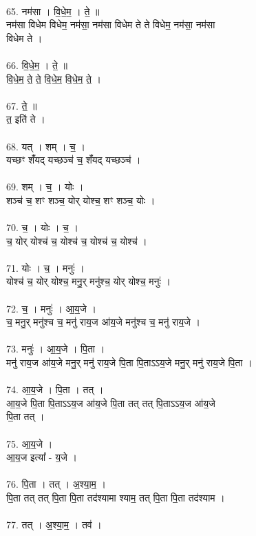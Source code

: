 \\
65. नम॑सा । वि॒धे॒म॒ । ते॒ ॥\\
नम॑सा विधेम विधेम॒ नम॑सा॒ नम॑सा विधेम ते ते विधेम॒ नम॑सा॒ नम॑सा\\
विधेम ते ।\\
\\
66. वि॒धे॒म॒ । ते॒ ॥\\
वि॒धे॒म॒ ते॒ ते॒ वि॒धे॒म॒ वि॒धे॒म॒ ते॒ ।\\
\\
67. ते॒ ॥\\
त॒ इति॑ ते ।\\
\\
68. यत् । शम् । च॒ ।\\
यच्छꣳ शंँयद् यच्छञ्च॑ च॒ शंँयद् यच्छञ्च॑ ।\\
\\
69. शम् । च॒ । योः ।\\
शञ्च॑ च॒ शꣳ शञ्च॒ योर् योश्च॒ शꣳ शञ्च॒ योः ।\\
\\
70. च॒ । योः । च॒ ।\\
च॒ योर् योश्च॑ च॒ योश्च॑ च॒ योश्च॑ च॒ योश्च॑ ।\\
\\
71. योः । च॒ । मनुः॑ ।\\
योश्च॑ च॒ योर् योश्च॒ मनु॒र् मनु॑श्च॒ योर् योश्च॒ मनुः॑ ।\\
\\
72. च॒ । मनुः॑ । आ॒य॒जे ।\\
च॒ मनु॒र् मनु॑श्च च॒ मनु॑ राय॒ज आ॑य॒जे मनु॑श्च च॒ मनु॑ राय॒जे ।\\
\\
73. मनुः॑ । आ॒य॒जे । पि॒ता ।\\
मनु॑ राय॒ज आ॑य॒जे मनु॒र् मनु॑ राय॒जे पि॒ता पि॒ताऽऽय॒जे मनु॒र् मनु॑ राय॒जे पि॒ता ।\\
\\
74. आ॒य॒जे । पि॒ता । तत् ।\\
आ॒य॒जे पि॒ता पि॒ताऽऽय॒ज आ॑य॒जे पि॒ता तत् तत् पि॒ताऽऽय॒ज आ॑य॒जे\\
पि॒ता तत् ।\\
\\
75. आ॒य॒जे ।\\
आ॒य॒ज इत्या᳚ - य॒जे ।\\
\\
76. पि॒ता । तत् । अ॒श्या॒म॒ ।\\
पि॒ता तत् तत् पि॒ता पि॒ता तद॑श्यामा श्याम॒ तत् पि॒ता पि॒ता तद॑श्याम ।\\
\\
77. तत् । अ॒श्या॒म॒ । तव॑ ।\\
